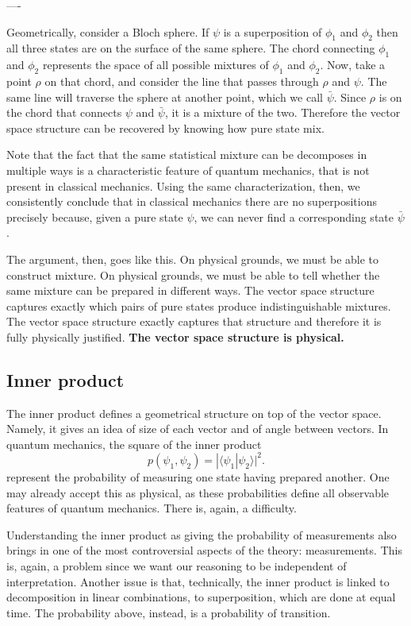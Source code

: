 \documentclass[10pt,twocolumn, nofootinbib]{revtex4-2}
\def\>{\rangle}
\def\<{\langle}
\begin{document}
----


 Geometrically, consider a Bloch sphere. If $\psi$ is a superposition of $\phi_1$ and $\phi_2$ then all three states are on the surface of the same sphere. The chord connecting $\phi_1$ and $\phi_2$ represents the space of all possible mixtures of $\phi_1$ and $\phi_2$. Now, take a point $\rho$ on that chord, and consider the line that passes through $\rho$ and $\psi$. The same line will traverse the sphere at another point, which we call $\bar{\psi}$. Since $\rho$ is on the chord that connects $\psi$ and  $\bar{\psi}$, it is a mixture of the two. Therefore the vector space structure can be recovered by knowing how pure state mix.

Note that the fact that the same statistical mixture can be decomposes in multiple ways is a characteristic feature of quantum mechanics, that is not present in classical mechanics. Using the same characterization, then, we consistently conclude that in classical mechanics there are no superpositions precisely because, given a pure state $\psi$, we can never find a corresponding state $\bar{\psi}$.

The argument, then, goes like this. On physical grounds, we must be able to construct mixture. On physical grounds, we must be able to tell whether the same mixture can be prepared in different ways. The vector space structure captures exactly which pairs of pure states produce indistinguishable mixtures. The vector space structure exactly captures that structure and therefore it is fully physically justified. \textbf{The vector space structure is physical.}

\subsection{Inner product}

The inner product defines a geometrical structure on top of the vector space. Namely, it gives an idea of size of each vector and of angle between vectors. In quantum mechanics, the square of the inner product
\begin{equation}
	p(\psi_1, \psi_2) = |\<\psi_1| \psi_2\>|^2.
\end{equation}
represent the probability of measuring one state having prepared another. One may already accept this as physical, as these probabilities define all observable features of quantum mechanics. There is, again, a difficulty.

Understanding the inner product as giving the probability of measurements also brings in one of the most controversial aspects of the theory: measurements. This is, again, a problem since we want our reasoning to be independent of interpretation. Another issue is that, technically, the inner product is linked to decomposition in linear combinations, to superposition, which are done at equal time. The probability above, instead, is a probability of transition.
\end{document}
